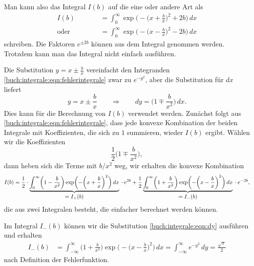 Man kann also das Integral $I(b)$ auf die eine oder andere Art als
\begin{equation}
\begin{aligned}
I(b)
&=
\int_0^\infty \exp\biggl(-\biggl(x+\frac{b}{x}\biggr)^2+2b\biggr)\,dx
\\
\text{oder}\quad\phantom{I(b)}
&=
\int_0^\infty \exp\biggl(-\biggl(x-\frac{b}{x}\biggr)^2-2b\biggr)\,dx
\end{aligned}
\label{buch:integrale:eqn:fehlerintegrale}
\end{equation}
schreiben.
Die Faktoren $e^{\pm 2b}$ können aus dem Integral genommen werden.
Trotzdem kann man das Integral nicht einfach ausführen.

Die Substitution $y=x\pm\frac{b}{x}$ vereinfacht den Integranden
\eqref{buch:integrale:eqn:fehlerintegrale}
zwar zu $e^{-y^2}$, aber die Substitution für $dx$ liefert
\begin{equation}
y=x\pm\frac{b}{x}
\qquad\Rightarrow\qquad
dy = \biggl(1\mp \frac{b}{x^2}\biggr)\,dx.
\label{buch:integrale:eqn:dy}
\end{equation}
Dies kann für die Berechnung von $I(b)$ verwendet werden.
Zunächst folgt aus \eqref{buch:integrale:eqn:fehlerintegrale},
dass jede konvexe Kombination der beiden Integrale mit Koeffizienten,
die sich zu $1$ summieren, wieder $I(b)$ ergibt.
Wählen wir die Koeffizienten 
\[
\frac12\biggl(1\mp\frac{b}{x^2}\biggr),
\]
dann heben sich die Terme mit $b/x^2$ weg, wir erhalten die
konvexe Kombination
\[
I(b)
=
\frac12
\cdot
\underbrace{
\int_0^\infty
\biggl(1-\frac{b}{x^2}\biggr)
\exp\biggl(-\biggl(x+\frac{b}{x}\biggr)^2\biggr)\,dx
}_{\displaystyle=I_+(b)}
\mathstrut
\cdot e^{2b}
+
\frac12
\underbrace{
\int_0^\infty
\biggl(1+\frac{b}{x^2}\biggr)
\exp\biggl(-\biggl(x-\frac{b}{x}\biggr)^2\biggr)\,dx
}_{\displaystyle=I_-(b)}
\mathstrut
\cdot e^{-2b},
\]
die aus zwei Integralen besteht, die einfacher berechnet werden können.

Im Integral $I_-(b)$ können wir die Substitution \eqref{buch:integrale:eqn:dy}
ausführen
und erhalten
\begin{align*}
I_-(b)
&=
\int_{-\infty}^\infty
\biggl(1+\frac{b}{x^2}\biggr)
\exp\biggl(-\biggl(x-\frac{b}{x}\biggr)^2\biggr)\,dx
=
\int_{-\infty}^\infty e^{-y^2}\,dy
=
\frac{\sqrt{\pi}}2
\end{align*}
nach Definition der Fehlerfunktion.

